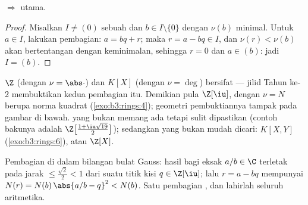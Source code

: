 \begin{theorem}\label{thm:b3:rings:euclideanpid}
 $\Rightarrow$  utama.
\end{theorem}

\begin{proof}
Misalkan $I \neq (0)$ sebuah  dan $b \in I \setminus\{0\}$ dengan
$\nu(b)$ minimal. Untuk $a \in I$, lakukan pembagian: $a = bq + r$; maka $r = a
- bq \in I$, dan $\nu(r) < \nu(b)$ akan bertentangan dengan keminimalan, sehingga
$r = 0$ dan $a \in (b)$: jadi $I = (b)$.
\end{proof}

\begin{example}\label{ex:b3:rings:euclidean}
$\Z$ (dengan $\nu = \abs\cdot$) dan $K[X]$ (dengan $\nu = \deg$) bersifat
 --- jilid Tahun ke-2 membuktikan kedua pembagian itu. Demikian pula
$\Z[\iu]$, dengan $\nu = N$ berupa norma kuadrat
(\cref{exo:b3:rings:4}); geometri pembuktiannya tampak pada
gambar di bawah.  yang bukan  memang ada tetapi sulit
dipastikan (contoh bakunya adalah
$\Z\bigl[\frac{1+\iu\sqrt{19}}2\bigr]$); sedangkan  yang bukan 
mudah dicari: $K[X, Y]$ (\cref{exo:b3:rings:6}), atau $\Z[X]$.
\end{example}

\begin{omfigure}

{\small Pembagian di dalam bilangan bulat Gauss: hasil bagi eksak
$a/b \in \C$ terletak pada jarak $\leq \frac{\sqrt2}{2} < 1$ dari
suatu titik kisi $q \in \Z[\iu]$; lalu $r = a - bq$ mempunyai $N(r) =
N(b)\,\abs{a/b - q}^2 < N(b)$. Satu pembagian , dan lahirlah
seluruh aritmetika.}
\end{omfigure}

